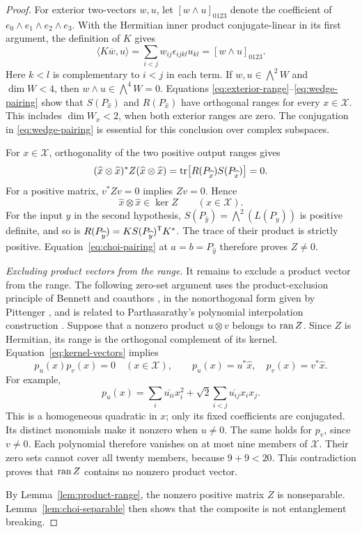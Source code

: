 \begin{proof}
For exterior two-vectors $w,u$, let $[w\wedge u]_{0123}$ denote the
coefficient of $e_0\wedge e_1\wedge e_2\wedge e_3$.  With the Hermitian
inner product conjugate-linear in its first argument, the definition of $K$
gives
\begin{equation}
 \langle K\overline w,u\rangle
 =\sum_{i<j}w_{ij}\epsilon_{ijkl}u_{kl}
 =[w\wedge u]_{0123}.
 \label{eq:wedge-pairing}
\end{equation}
Here $k<l$ is complementary to $i<j$ in each term.  If
$w,u\in\bigwedge^2W$ and $\dim W<4$, then
$w\wedge u\in\bigwedge^4W=0$.  Equations
\eqref{eq:exterior-range}--\eqref{eq:wedge-pairing} show that
$S(P_{\widehat x})$ and $R(P_{\widehat x})$ have orthogonal ranges for every
$x\in\mathcal X$.  This includes $\dim W_x<2$, when both exterior ranges
are zero.  The conjugation in \eqref{eq:wedge-pairing} is essential for this
conclusion over complex subspaces.

For $x\in\mathcal X$, orthogonality of the two positive output ranges gives
\[
 (\widehat x\otimes\widehat x)^*Z(\widehat x\otimes\widehat x)
 =\operatorname{tr}\bigl[R(P_{\widehat x})S(P_{\widehat x})\bigr]=0.
\]
For a positive matrix, $v^*Zv=0$ implies $Zv=0$.  Hence
\begin{equation}
 \widehat x\otimes\widehat x\in\ker Z\qquad(x\in\mathcal X).
 \label{eq:kernel-vectors}
\end{equation}
For the input $y$ in the second hypothesis,
$S(P_{\widehat y})=\bigwedge^2(L(P_y))$ is positive definite, and so is
$R(P_{\widehat y})=K S(P_{\widehat y})^{\mathsf T}K^*$.  The trace of their
product is strictly positive.  Equation~\eqref{eq:choi-pairing} at
$a=b=P_{\widehat y}$ therefore proves $Z\ne0$.

\emph{Excluding product vectors from the range.}
It remains to exclude a product vector from the range.
The following zero-set argument uses the product-exclusion principle of
Bennett and coauthors \cite[Lemma~1]{Bennett1999}, in the nonorthogonal
form given by Pittenger \cite[Section~IV, Lemma~3]{Pittenger2003}, and
is related to Parthasarathy's polynomial interpolation construction
\cite[Proposition~1.3]{Parthasarathy2004}.
Suppose that a nonzero product $u\otimes v$ belongs to $\operatorname{ran} Z$.  Since
$Z$ is Hermitian, its range is the orthogonal complement of its kernel.
Equation~\eqref{eq:kernel-vectors} implies
\[
 p_u(x)p_v(x)=0\quad(x\in\mathcal X),\qquad
 p_u(x)=u^*\widehat x,\quad p_v(x)=v^*\widehat x.
\]
For example,
\[
 p_u(x)=\sum_i\overline{u_{ii}}x_i^2
       +\sqrt2\sum_{i<j}\overline{u_{ij}}x_ix_j.
\]
This is a homogeneous quadratic in $x$; only its fixed coefficients are
conjugated.  Its distinct monomials make it nonzero when $u\ne0$.
The same holds for $p_v$, since $v\ne0$.  Each polynomial therefore
vanishes on at most nine members of $\mathcal X$.  Their zero sets cannot
cover all twenty members, because $9+9<20$.  This contradiction proves
that $\operatorname{ran} Z$ contains no nonzero product vector.

By Lemma~\ref{lem:product-range}, the nonzero positive matrix $Z$ is
nonseparable.  Lemma~\ref{lem:choi-separable} then shows that the composite
is not entanglement breaking.
\end{proof}
